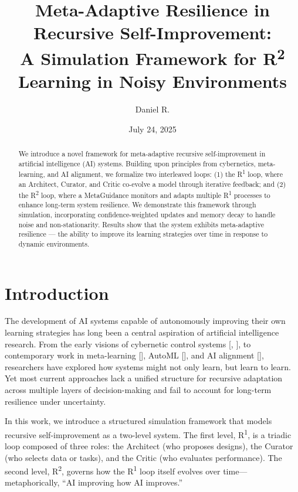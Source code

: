 \documentclass{article}
\title{Meta-Adaptive Resilience in Recursive Self-Improvement: \\ A Simulation Framework for R\textsuperscript{2} Learning in Noisy Environments}
\author{Daniel R.} %
\date{July 24, 2025} %
\begin{document}
\maketitle

\begin{abstract}
We introduce a novel framework for meta-adaptive recursive self-improvement in artificial intelligence (AI) systems. Building upon principles from cybernetics, meta-learning, and AI alignment, we formalize two interleaved loops: (1) the R\textsuperscript{1} loop, where an Architect, Curator, and Critic co-evolve a model through iterative feedback; and (2) the R\textsuperscript{2} loop, where a MetaGuidance monitors and adapts multiple R\textsuperscript{1} processes to enhance long-term system resilience. We demonstrate this framework through simulation, incorporating confidence-weighted updates and memory decay to handle noise and non-stationarity. Results show that the system exhibits meta-adaptive resilience — the ability to improve its learning strategies over time in response to dynamic environments.
\end{abstract}

\section{Introduction}
The development of AI systems capable of autonomously improving their own learning strategies has long been a central aspiration of artificial intelligence research. From the early visions of cybernetic control systems [\cite{wiener1948cybernetics}, \cite{ashby1956ic}], to contemporary work in meta-learning [\cite{finn2017maml}], AutoML [\cite{elsken2019neural}], and AI alignment [\cite{christiano2018amplification}], researchers have explored how systems might not only learn, but learn to learn. Yet most current approaches lack a unified structure for recursive adaptation across multiple layers of decision-making and fail to account for long-term resilience under uncertainty.

In this work, we introduce a structured simulation framework that models recursive self-improvement as a two-level system. The first level, R\textsuperscript{1}, is a triadic loop composed of three roles: the Architect (who proposes designs), the Curator (who selects data or tasks), and the Critic (who evaluates performance). The second level, R\textsuperscript{2}, governs how the R\textsuperscript{1} loop itself evolves over time—metaphorically, “AI improving how AI improves.”
\end{document}
